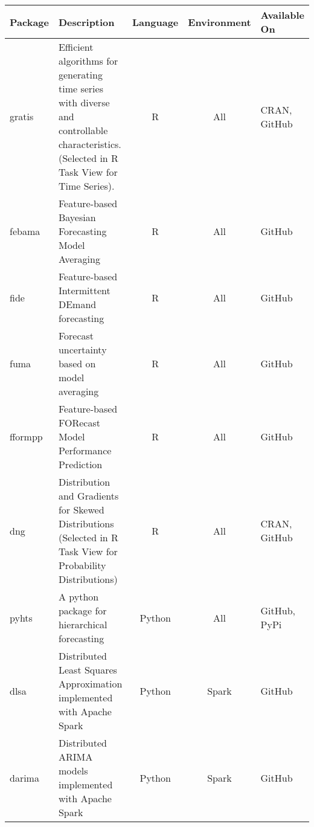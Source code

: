 \documentclass[twoside,a4paper]{article}
\begin{document}
\begin{center}
\begin{tabular}{lp{9cm}ccl}
  \toprule
  Package   & Description                                                                                                                                            & Language & Environment & Available On \\
  \midrule
gratis      & Efficient algorithms for generating time series with diverse and controllable characteristics. {\color{red}(Selected in R Task View for Time Series)}. & R        & All         & CRAN, GitHub \\
febama      & Feature-based Bayesian Forecasting Model Averaging                                                                                                     & R        & All         & GitHub       \\
fide        & Feature-based Intermittent DEmand forecasting                                                                                                          & R        & All         & GitHub       \\
fuma        & Forecast uncertainty based on model averaging                                                                                                          & R        & All         & GitHub       \\
fformpp     & Feature-based FORecast Model Performance Prediction                                                                                                    & R        & All         & GitHub       \\
dng         & Distribution and Gradients for Skewed Distributions  {\color{red}(Selected in R Task View for Probability Distributions)}                              & R        & All         & CRAN, GitHub \\
pyhts       & A python package for hierarchical forecasting                                                                                                          & Python   & All         & GitHub, PyPi \\
dlsa        & Distributed Least Squares Approximation implemented with Apache Spark                                                                                  & Python   & Spark       & GitHub       \\
darima      & Distributed ARIMA models implemented with Apache Spark                                                                                                 & Python   & Spark       & GitHub       \\

\end{tabular}
\end{center}
\end{document}
